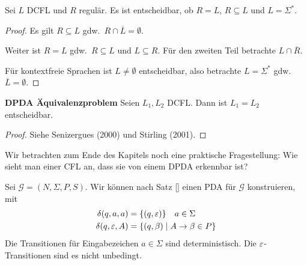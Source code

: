 \begin{Satz}
    Sei $L$ DCFL und $R$ regulär.
    Es ist entscheidbar, ob $R=L$, $R\subseteq L$ und $L=\Sigma^*$.
\end{Satz}
\begin{proof}
    Es gilt $R\subseteq L$ gdw.\ $R \cap \overline{L} = \emptyset$.
    
    Weiter ist $R = L$ gdw.\ $R\subseteq L$ und $L \subseteq R$. Für den zweiten Teil betrachte $L\cap \overline{R}$.
    
    Für kontextfreie Sprachen ist $L\ne \emptyset$ entscheidbar, also betrachte $L=\Sigma^*$ gdw.\ $\overline{L}=\emptyset$.
\end{proof}

\begin{Satz} \textbf{DPDA Äquivalenzproblem}
    Seien $L_1, L_2$ DCFL. Dann ist $L_1 = L_2$ entscheidbar.
\end{Satz}

\begin{proof}
    Siehe Senizergues (2000) und Stirling (2001).
\end{proof}

Wir betrachten zum Ende des Kapitels noch eine praktische Fragestellung: Wie sieht man einer CFL an, dass sie von einem DPDA erkennbar ist?

Sei $\mathcal{G} = (N, \Sigma, P, S)$.
Wir können nach Satz \ref{} einen PDA für $\mathcal{G}$ konstruieren, mit
\begin{align*}
  \delta(q, a, a) &= \{(q, \varepsilon)\} \quad a \in \Sigma \\
  \delta(q, \varepsilon, A) &= \{(q, \beta)  \mid A \to \beta \in P\}
\end{align*}
Die Transitionen für Eingabezeichen $a \in \Sigma$ sind deterministisch.
Die $\varepsilon$-Transitionen sind es nicht unbedingt.

